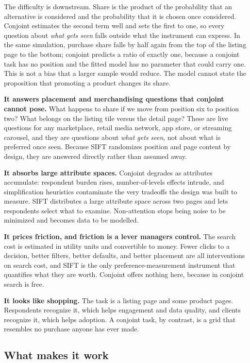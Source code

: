 \documentclass[
  letterpaper,
  DIV=11,
  numbers=noendperiod]{scrartcl}
\begin{document}
The difficulty is downstream. Share is the product of the probability
that an alternative is considered and the probability that it is chosen
once considered. Conjoint estimates the second term well and sets the
first to one, so every question about \emph{what gets seen} falls
outside what the instrument can express. In the same simulation,
purchase share falls by half again from the top of the listing page to
the bottom; conjoint predicts a ratio of exactly one, because a conjoint
task has no position and the fitted model has no parameter that could
carry one. This is not a bias that a larger sample would reduce. The
model cannot state the proposition that promoting a product changes its
share.

\textbf{It answers placement and merchandising questions that conjoint
cannot pose.} What happens to share if we move from position six to
position two? What belongs on the listing tile versus the detail page?
These are live questions for any marketplace, retail media network, app
store, or streaming carousel, and they are questions about \emph{what
gets seen}, not about what is preferred once seen. Because SIFT
randomizes position and page content by design, they are answered
directly rather than assumed away.

\textbf{It absorbs large attribute spaces.} Conjoint degrades as
attributes accumulate: respondent burden rises, number-of-levels effects
intrude, and simplification heuristics contaminate the very tradeoffs
the design was built to measure. SIFT distributes a large attribute
space across two pages and lets respondents select what to examine.
Non-attention stops being noise to be minimized and becomes data to be
modelled.

\textbf{It prices friction, and friction is a lever managers control.}
The search cost is estimated in utility units and convertible to money.
Fewer clicks to a decision, better filters, better defaults, and better
placement are all interventions on search cost, and SIFT is the only
preference-measurement instrument that quantifies what they are worth.
Conjoint offers nothing here, because in conjoint search is free.

\textbf{It looks like shopping.} The task is a listing page and some
product pages. Respondents recognize it, which helps engagement and data
quality, and clients recognize it, which helps adoption. A conjoint
task, by contrast, is a grid that resembles no purchase anyone has ever
made.

\subsection{What makes it work}\label{what-makes-it-work}
\end{document}
